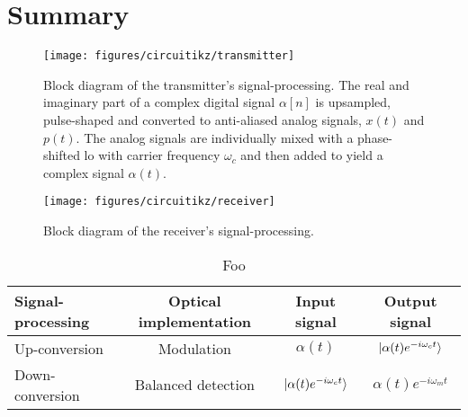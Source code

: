 \section*{Summary}

\begin{figure}[htb]
	\centering
	\texttt{[image: figures/circuitikz/transmitter]}
	\caption{Block diagram of the transmitter's signal-processing. The real and imaginary part of a complex digital signal $\alpha[n]$ is upsampled, pulse-shaped and converted to anti-aliased analog signals, $x(t)$ and $p(t)$. The analog signals are individually mixed with a phase-shifted \gls{lo} with carrier frequency $\omega_c$ and then added to yield a complex signal $\alpha(t)$.}\label{fig:transmitter_signal_processing}
\end{figure}

\begin{figure}[htb]
	\centering
	\texttt{[image: figures/circuitikz/receiver]}
	\caption{Block diagram of the receiver's signal-processing.}\label{fig:receiver_signal_processing}
\end{figure}

\begin{table}[htb]
  \centering
  \begin{tabular}{lccc}
    \toprule
    Signal-processing & Optical implementation & Input signal & Output signal \\
    \midrule
    Up-conversion & Modulation & $\alpha(t)$ & $\lvert\alpha(t)e^{-i\omega_c t}\rangle$ \\
    Down-conversion & Balanced detection & $\lvert\alpha(t)e^{-i\omega_c t}\rangle$ & $\alpha(t)e^{-i\omega_mt}$ \\
    \bottomrule
  \end{tabular}
  \caption{Foo}
\end{table}